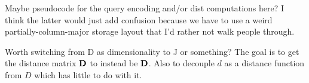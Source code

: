 Maybe pseudocode for the query encoding and/or dist computations here? I think the latter would just add confusion because we have to use a weird partially-column-major storage layout that I'd rather not walk people through.

Worth switching from D as dimensionality to J or something? The goal is to get the distance matrix $\mathbf{D}$ to instead be $\mathbf{D}$. Also to decouple $d$ as a distance function from $D$ which has little to do with it.


















